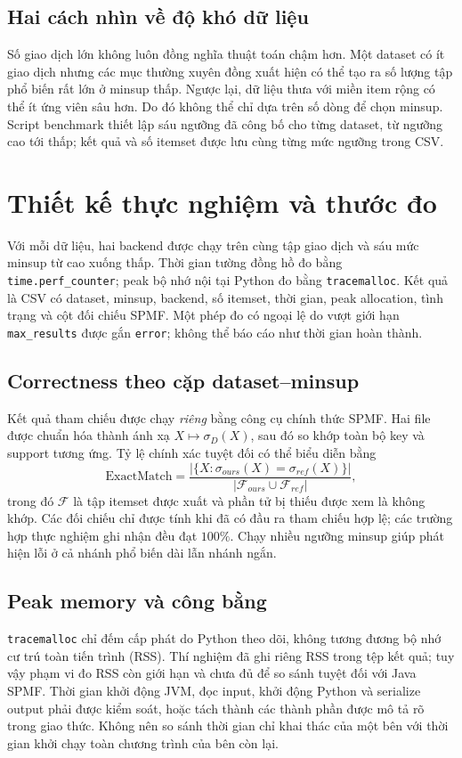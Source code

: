 \documentclass[conference,10pt]{IEEEtran}
\newcommand{\myitem}[1]{\texttt{#1}}
\begin{document}
\subsection{Hai cách nhìn về độ khó dữ liệu}
Số giao dịch lớn không luôn đồng nghĩa thuật toán chậm hơn. Một dataset có ít giao dịch nhưng các mục thường xuyên đồng xuất hiện có thể tạo ra số lượng tập phổ biến rất lớn ở minsup thấp. Ngược lại, dữ liệu thưa với miền item rộng có thể ít ứng viên sâu hơn. Do đó không thể chỉ dựa trên số dòng để chọn minsup. Script benchmark thiết lập sáu ngưỡng đã công bố cho từng dataset, từ ngưỡng cao tới thấp; kết quả và số itemset được lưu cùng từng mức ngưỡng trong CSV.

\section{Thiết kế thực nghiệm và thước đo}
Với mỗi dữ liệu, hai backend được chạy trên cùng tập giao dịch và sáu mức minsup từ cao xuống thấp. Thời gian tường đồng hồ đo bằng \myitem{time.perf\_counter}; peak bộ nhớ nội tại Python đo bằng \myitem{tracemalloc}. Kết quả là CSV có dataset, minsup, backend, số itemset, thời gian, peak allocation, tình trạng và cột đối chiếu SPMF. Một phép đo có ngoại lệ do vượt giới hạn \myitem{max\_results} được gắn \myitem{error}; không thể báo cáo như thời gian hoàn thành.

\subsection{Correctness theo cặp dataset--minsup}
Kết quả tham chiếu được chạy \emph{riêng} bằng công cụ chính thức SPMF. Hai file được chuẩn hóa thành ánh xạ $X\mapsto\sigma_D(X)$, sau đó so khớp toàn bộ key và support tương ứng. Tỷ lệ chính xác tuyệt đối có thể biểu diễn bằng
\begin{equation}\label{eq:accuracy}
\mathrm{ExactMatch}=\frac{|\{X:\sigma_{ours}(X)=\sigma_{ref}(X)\}|}{|\mathcal{F}_{ours}\cup\mathcal{F}_{ref}|},
\end{equation}
trong đó $\mathcal F$ là tập itemset được xuất và phần tử bị thiếu được xem là không khớp. Các đối chiếu chỉ được tính khi đã có đầu ra tham chiếu hợp lệ; các trường hợp thực nghiệm ghi nhận đều đạt $100\%$. Chạy nhiều ngưỡng minsup giúp phát hiện lỗi ở cả nhánh phổ biến dài lẫn nhánh ngắn.

\subsection{Peak memory và công bằng}
\myitem{tracemalloc} chỉ đếm cấp phát do Python theo dõi, không tương đương bộ nhớ cư trú toàn tiến trình (RSS). Thí nghiệm đã ghi riêng RSS trong tệp kết quả; tuy vậy phạm vi đo RSS còn giới hạn và chưa đủ để so sánh tuyệt đối với Java SPMF. Thời gian khởi động JVM, đọc input, khởi động Python và serialize output phải được kiểm soát, hoặc tách thành các thành phần được mô tả rõ trong giao thức. Không nên so sánh thời gian chỉ khai thác của một bên với thời gian khởi chạy toàn chương trình của bên còn lại.
\end{document}
